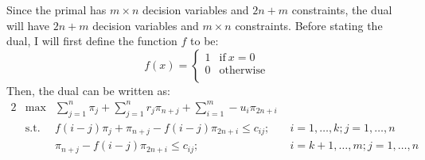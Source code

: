 \documentclass[12pt]{article}
\begin{document}
\begin{enumerate}
    Since the primal has $m\times n$ decision variables and $2n+m$ constraints,
    the dual will have $2n+m$ decision variables and $m\times n$ constraints.
    Before stating the dual, I will first define the function $f$ to be:
    \begin{equation}
      f(x) =
        \begin{cases}
          1&\text{if}\ x=0\\
          0&\text{otherwise}\\
        \end{cases}
    \end{equation}
    Then, the dual can be written as:
    \begin{alignat*}{2}
      &\text{max}
        &\sum_{j=1}^n\pi_j+\sum_{j=1}^nr_j\pi_{n+j}+\sum_{i=1}^m-u_i\pi_{2n+i}\\
      &\text{s.t.}
        &f(i-j)\pi_j+\pi_{n+j}-f(i-j)\pi_{2n+i}\leq c_{ij};\quad
        &i=1,\ldots,k;j=1,\ldots,n\\
      &&\pi_{n+j}-f(i-j)\pi_{2n+i}\leq c_{ij};\quad
        &i=k+1,\ldots,m;j=1,\ldots,n\\
    \end{alignat*}


\end{enumerate}
\end{document}
